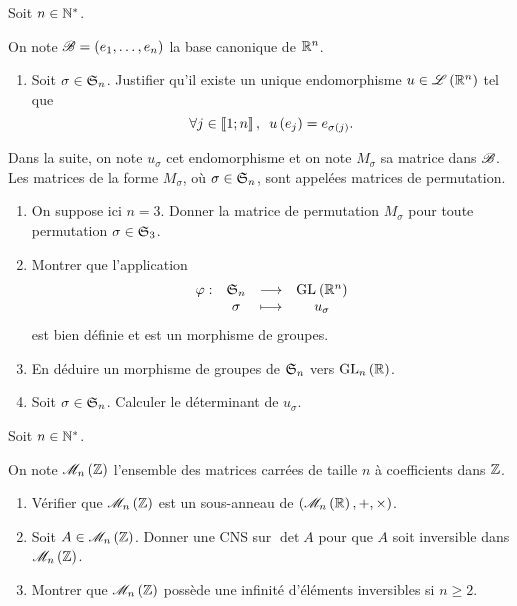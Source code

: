 \begin{exo}
Soit \(n\in\Ns\).

On note \(\fami{B}=\paren{e_1,\dots,e_n}\) la base canonique de \(\R^n\).

\begin{enumerate}[series=det15]
\item Soit \(\sigma\in\S{n}\). Justifier qu'il existe un unique endomorphisme \(u\in\Lendo{\R^n}\) tel que \[\quantifs{\forall j\in\interventierii{1}{n}}u\paren{e_j}=e_{\sigma\paren{j}}.\]
\end{enumerate}

Dans la suite, on note \(u_\sigma\) cet endomorphisme et on note \(M_\sigma\) sa matrice dans \(\fami{B}\). Les matrices de la forme \(M_\sigma\), où \(\sigma\in\S{n}\), sont appelées matrices de permutation.

\begin{enumerate}[resume=det15]
\item On suppose ici \(n=3\). Donner la matrice de permutation \(M_\sigma\) pour toute permutation \(\sigma\in\S{3}\). \\

\item Montrer que l'application \[\fonction{\phi}{\S{n}}{\GL{}[\R^n]}{\sigma}{u_\sigma}\] est bien définie et est un morphisme de groupes. \\

\item En déduire un morphisme de groupes de \(\S{n}\) vers \(\GL{n}[\R]\). \\

\item Soit \(\sigma\in\S{n}\). Calculer le déterminant de \(u_\sigma\).
\end{enumerate}
\end{exo}

\begin{corr}
\end{corr}

\begin{exo}
Soit \(n\in\Ns\).

On note \(\M{n}[\Z]\) l'ensemble des matrices carrées de taille \(n\) à coefficients dans \(\Z\).

\begin{enumerate}
\item Vérifier que \(\M{n}[\Z]\) est un sous-anneau de \(\anneau{\M{n}[\R]}\). \\

\item Soit \(A\in\M{n}[\Z]\). Donner une CNS sur \(\det A\) pour que \(A\) soit inversible dans \(\M{n}[\Z]\). \\

\item Montrer que \(\M{n}[\Z]\) possède une infinité d'éléments inversibles si \(n\geq2\).
\end{enumerate}
\end{exo}

